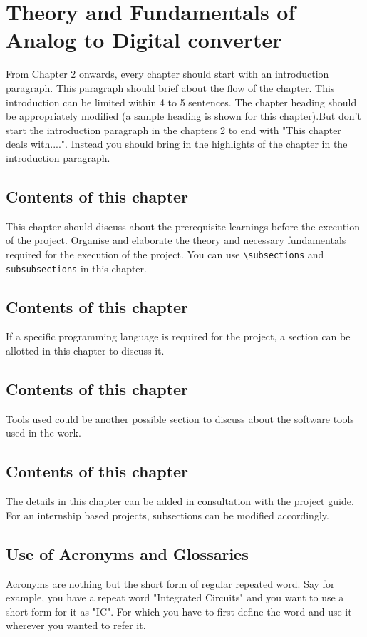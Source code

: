 \chapter{Theory and Fundamentals of Analog to Digital converter}

From Chapter 2 onwards, every chapter should start with an introduction paragraph. This paragraph should brief about the flow of the chapter. This introduction can be limited within 4 to 5 sentences. The chapter heading should be appropriately modified (a sample heading is shown for this chapter).But don't start the introduction paragraph in the chapters 2 to end with "This chapter deals with....". Instead you should bring in the highlights of the chapter in the introduction paragraph.

\section{Contents of this chapter}

This chapter should discuss about the prerequisite learnings before the execution of the project. Organise and elaborate the theory and necessary fundamentals required for the execution of the project. You can use \verb|\subsections| and \verb|subsubsections| in this chapter.
\section{Contents of this chapter}
If a specific programming language is required for the project, a section can be allotted in this chapter to discuss it. 
\section{Contents of this chapter}
Tools used could be another possible section to discuss about the software tools used in the work. 
\section{Contents of this chapter}
The details in this chapter can be added in consultation with the project guide. For an internship based projects, subsections can be modified accordingly. 

\section{Use of Acronyms and Glossaries}
Acronyms are nothing but the short form of regular repeated word. Say for example, you have a repeat word "Integrated Circuits" and you want to use a short form for it as "IC". For which you have to first define the word and use it wherever you wanted to refer it.

